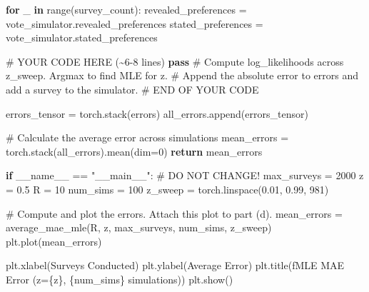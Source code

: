 \documentclass[
  letterpaper,
  numbers=noenddot,
  DIV=11]{scrreprt}
\newenvironment{Shaded}{\begin{snugshade}}{\end{snugshade}}
\newcommand{\BuiltInTok}[1]{\textcolor[rgb]{0.00,0.23,0.31}{#1}}
\newcommand{\CommentTok}[1]{\textcolor[rgb]{0.37,0.37,0.37}{#1}}
\newcommand{\ControlFlowTok}[1]{\textcolor[rgb]{0.00,0.23,0.31}{\textbf{#1}}}
\newcommand{\DecValTok}[1]{\textcolor[rgb]{0.68,0.00,0.00}{#1}}
\newcommand{\FloatTok}[1]{\textcolor[rgb]{0.68,0.00,0.00}{#1}}
\newcommand{\KeywordTok}[1]{\textcolor[rgb]{0.00,0.23,0.31}{\textbf{#1}}}
\newcommand{\NormalTok}[1]{\textcolor[rgb]{0.00,0.23,0.31}{#1}}
\newcommand{\OperatorTok}[1]{\textcolor[rgb]{0.37,0.37,0.37}{#1}}
\newcommand{\RegionMarkerTok}[1]{\textcolor[rgb]{0.00,0.23,0.31}{#1}}
\newcommand{\SpecialCharTok}[1]{\textcolor[rgb]{0.37,0.37,0.37}{#1}}
\newcommand{\SpecialStringTok}[1]{\textcolor[rgb]{0.13,0.47,0.30}{#1}}
\newcommand{\StringTok}[1]{\textcolor[rgb]{0.13,0.47,0.30}{#1}}
\newcommand{\VariableTok}[1]{\textcolor[rgb]{0.07,0.07,0.07}{#1}}
\theoremstyle{definition}
\theoremstyle{plain}
\theoremstyle{plain}
\theoremstyle{remark}
\begin{document}
\begin{tcolorbox}[colframe=.grey, title=\faCode \enspace Code]
\begin{Shaded}
\begin{Highlighting}[numbers=left,,]
        \ControlFlowTok{for}\NormalTok{ \_ }\KeywordTok{in} \BuiltInTok{range}\NormalTok{(survey\_count):}
\NormalTok{            revealed\_preferences }\OperatorTok{=}\NormalTok{ vote\_simulator.revealed\_preferences}
\NormalTok{            stated\_preferences }\OperatorTok{=}\NormalTok{ vote\_simulator.stated\_preferences}

            \CommentTok{\# YOUR CODE HERE (\textasciitilde{}6{-}8 lines)}
            \ControlFlowTok{pass} \CommentTok{\# Compute log\_likelihoods across z\_sweep. Argmax to find MLE for z. }
                 \CommentTok{\# Append the absolute error to errors and add a survey to the simulator.}
            \CommentTok{\# }\RegionMarkerTok{END}\CommentTok{ OF YOUR CODE}

\NormalTok{        errors\_tensor }\OperatorTok{=}\NormalTok{ torch.stack(errors) }
\NormalTok{        all\_errors.append(errors\_tensor)}

    \CommentTok{\# Calculate the average error across simulations }
\NormalTok{    mean\_errors }\OperatorTok{=}\NormalTok{ torch.stack(all\_errors).mean(dim}\OperatorTok{=}\DecValTok{0}\NormalTok{)}
    \ControlFlowTok{return}\NormalTok{ mean\_errors}

\ControlFlowTok{if} \VariableTok{\_\_name\_\_} \OperatorTok{==} \StringTok{"\_\_main\_\_"}\NormalTok{:}
    \CommentTok{\# DO NOT CHANGE!}
\NormalTok{    max\_surveys }\OperatorTok{=} \DecValTok{2000}
\NormalTok{    z }\OperatorTok{=} \FloatTok{0.5}
\NormalTok{    R }\OperatorTok{=} \DecValTok{10}
\NormalTok{    num\_sims }\OperatorTok{=} \DecValTok{100}
\NormalTok{    z\_sweep }\OperatorTok{=}\NormalTok{ torch.linspace(}\FloatTok{0.01}\NormalTok{, }\FloatTok{0.99}\NormalTok{, }\DecValTok{981}\NormalTok{)}

    \CommentTok{\# Compute and plot the errors. Attach this plot to part (d).}
\NormalTok{    mean\_errors }\OperatorTok{=}\NormalTok{ average\_mae\_mle(R, z, max\_surveys, num\_sims, z\_sweep)}
\NormalTok{    plt.plot(mean\_errors)}

\NormalTok{    plt.xlabel(}\StringTok{\textquotesingle{}Surveys Conducted\textquotesingle{}}\NormalTok{)}
\NormalTok{    plt.ylabel(}\StringTok{\textquotesingle{}Average Error\textquotesingle{}}\NormalTok{)}
\NormalTok{    plt.title(}\SpecialStringTok{f\textquotesingle{}MLE MAE Error (z=}\SpecialCharTok{\{}\NormalTok{z}\SpecialCharTok{\}}\SpecialStringTok{, }\SpecialCharTok{\{}\NormalTok{num\_sims}\SpecialCharTok{\}}\SpecialStringTok{ simulations)\textquotesingle{}}\NormalTok{)}
\NormalTok{    plt.show()}
\end{Highlighting}
\end{Shaded}

\end{tcolorbox}
\end{document}
